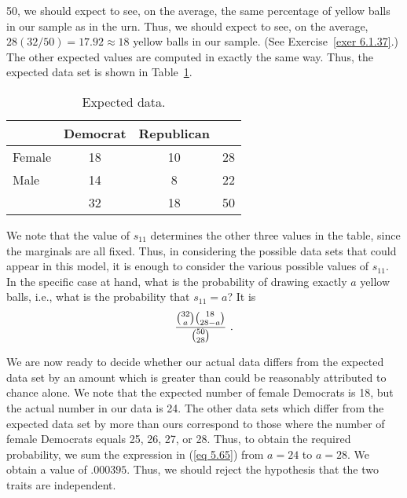 \begin{example}
50, we should expect to see, on the average, the same percentage of yellow balls in
our sample as in the urn.  Thus, we should expect to see, on the average, $28(32/50)
= 17.92 \approx 18$ yellow balls in our sample.  (See Exercise~\ref{exer 6.1.37}.)
The other expected values are computed in exactly the same way.  Thus, the
expected data set is shown in Table~\ref{table 5.4}.
\begin{table}
\centering
\begin{tabular}{|l|c|c|c|}
\hline
 & \hspace{.15in}Democrat\hspace{.15in} & \hspace{.1in}Republican \hspace{.1in} & \\ \hline 
\hspace{.1in}Female & 18 & 10           & \hspace{.2in}28\hspace{.2in}\\ \hline 
\hspace{.1in}Male   & 14 & \hspace{.075in}8  & \hspace{.2in}22 \\ \hline
 & 32 & 18 & \hspace{.2in}50\\ \hline
\end{tabular}
\caption{Expected data.}
\label{table 5.4}
\end{table}
We note that the value of $s_{11}$ determines the other three values in the table,
since the marginals are all fixed.  Thus, in considering the possible data sets that
could appear in this model, it is enough to consider the various possible values of
$s_{11}$.  In the specific case at hand, what is the probability of drawing exactly
$a$ yellow balls, i.e., what is the probability that $s_{11} = a$?  It is
\begin{equation}{{{{32}\choose{a}}{{18}\choose{28-a}}}\over{{{50}\choose{28}}}}\ .
\label{eq 5.65}
\end{equation}
\par We are now ready to decide whether our actual data differs from the expected data
set by an amount which is greater than could be reasonably attributed to chance
alone.  We note that the expected number of female Democrats is 18, but the actual
number in our data is 24.  The other data sets which differ from the expected data set
by more than ours correspond to those where the number of female Democrats equals 25,
26, 27, or 28.  Thus, to obtain the required probability, we sum the expression in
(\ref{eq 5.65}) from $a = 24$ to $a = 28$.  We obtain a value of $.000395$.  Thus, we
should reject the hypothesis that the two traits are independent.
\end{example}
